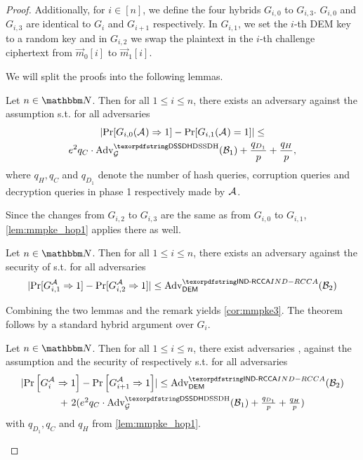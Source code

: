 \begin{proof}
  Additionally, for $i\in[n]$, we define the four hybrids $G_{i,0}$ to $G_{i,3}$. $G_{i,0}$ and $G_{i,3}$ are identical
  to $G_i$ and $G_{i+1}$ respectively. In $G_{i,1}$, we set the $i$-th DEM key to a random key and in $G_{i,2}$ we swap
  the plaintext in the $i$-th challenge ciphertext from $\vec{m}_0[i]$ to $\vec{m}_1[i]$.

  We will split the proofs into the following lemmas.
  \begin{lemma}\label{lem:mmpke_hop1}
    Let $n\in\N$. Then for all $1\leq i \le n$, there exists an adversary \Bdv[1] against the \sdh assumption s.t. for all adversaries \Adv
    \begin{multline*}
      \abs{\Pr[G_{i,0}(\Adv)\Rightarrow 1]- \Pr[G_{i,1}({\Adv}) = 1]} \leq \\
      e^2q_C\cdot\adv{\sdh}{\Group}({\Bdv[1]}) + \frac{q_{D_1}}{p} + \frac{q_H}{p},
    \end{multline*}
    where $q_H, q_C$ and $q_{D_1}$ denote the number of hash queries, corruption queries and decryption queries in phase
    1 respectively made by $\mathcal{A}_{\relax}$.
  \end{lemma}
  \begin{remark}
    Since the changes from $G_{i,2}$ to $G_{i,3}$ are the same as from $G_{i,0}$ to $G_{i,1}$, \cref{lem:mmpke_hop1} applies there as
    well.
  \end{remark}

  \begin{lemma}\label{lem:mmpke_hop2}
    Let $n\in\N$. Then for all $1\leq i \le n$, there exists an adversary \Bdv[2] against the \indrcca security of \dem s.t. for all adversaries \Adv
    \[
      \abs{\Pr[G_{i,1}^{\Adv}\Rightarrow 1]-\Pr[G_{i,2}^{\Adv}\Rightarrow 1]} \leq \adv{\indrcca}{\dem}({\Bdv[2]})
    \]
  \end{lemma}

  Combining the two lemmas and the remark yields \cref{cor:mmpke3}. The theorem follows by a standard hybrid
  argument over $G_i$.

  \begin{corollary}\label{cor:mmpke3}
    Let $n\in\N$. Then for all $1\leq i \le n$, there exist adversaries \Bdv[1], \Bdv[2] against the \sdh assumption and
    the \indrcca security of \dem respectively s.t. for all adversaries \Adv
    \begin{multline*}
      \abs{\Pr\left[G_i^{\Adv}\Rightarrow 1\right] - \Pr\left[G_{i+1}^{\Adv}\Rightarrow 1\right]} \leq  \adv{\indrcca}{\dem}({\Bdv[2]}) \\
      \begin{array}{c}
        +\ 2(e^2q_C\cdot\adv{\sdh}{\Group}({\Bdv[1]}) + \frac{q_{D_1}}{p} + \frac{q_H}{p}) \\
      \end{array}
    \end{multline*}
    with $q_{D_1}, q_C$ and $q_H$ from \cref{lem:mmpke_hop1}.
  \end{corollary}


\end{proof}
